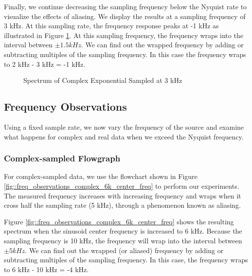 \documentclass{article}
\begin{document}
Finally, we continue decreasing the sampling frequency below the Nyquist rate to visualize the effects of aliasing. We display the results at a sampling frequency of 3 kHz. At this sampling rate, the frequency response peaks at -1 kHz as illustrated in Figure \ref{fig::complex_sampling_freq_domain_3k_samp_rate}. At this sampling frequency, the frequency wraps into the interval between $\pm 1.5 kHz$. We can find out the wrapped frequency by adding or subtracting multiples of the sampling frequency. In this case the frequency wraps to 2 kHz - 3 kHz = -1 kHz.

\begin{figure}[H]
	\centerline{}
	\caption{Spectrum of Complex Exponential Sampled at 3 kHz}
	\label{fig::complex_sampling_freq_domain_3k_samp_rate}
\end{figure}

\subsection{Frequency Observations}

Using a fixed sample rate, we now vary the frequency of the source and examine what happens for complex and real data when we exceed the Nyquist frequency.

\subsubsection{Complex-sampled Flowgraph}

For complex-sampled data, we use the flowchart shown in Figure \ref{fig::freq_observations_complex_6k_center_freq} to perform our experiments. The measured frequency increases with increasing frequency and wraps when it cross half the sampling rate (5 kHz), through a phenomenon known as aliasing.

Figure \ref{fig::freq_observations_complex_6k_center_freq} shows the resulting spectrum when the sinusoid center frequency is increased to 6 kHz. Because the sampling frequency is 10 kHz, the frequency will wrap into the interval between $\pm 5 kHz$. We can find out the wrapped (or aliased) frequency by adding or subtracting multiples of the sampling frequency. In this case, the frequency wraps to 6 kHz - 10 kHz = -4 kHz.
\end{document}
